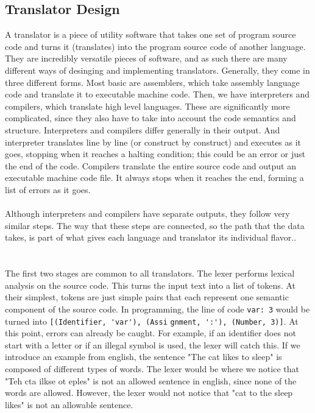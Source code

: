 \documentclass[a4paper, 12pt]{article}
\begin{document}
\subsection{Translator Design}\label{sec:translator-design}
A translator is a piece of utility software that takes one set of program source code and turns it (translates) into the program source code of another language. They are incredibly versatile pieces of software, and as such there are many different ways of desinging and implementing translators. Generally, they come in three different forms. Most basic are assemblers, which take assembly language code and translate it to executable machine code. Then, we have interpreters and compilers, which translate high level languages. These are significantly more complicated, since they also have to take into account the code semantics and structure. Interpreters and compilers differ generally in their output. And interpreter translates line by line (or construct by construct) and executes as it goes, stopping when it reaches a halting condition; this could be an error or just the end of the code. Compilers translate the entire source code and output an executable machine code file. It always stops when it reaches the end, forming a list of errors as it goes.\\
\\
Although interpreters and compilers have separate outputs, they follow very similar steps. The way that these steps are connected, so the path that the data takes, is part of what gives each language and translator its individual flavor..\\
\\
\\
The first two stages are common to all translators. The lexer performs lexical analysis on the source code. This turns the input text into a list of tokens. At their simplest, tokens are just simple pairs that each represent one semantic component of the source code. In programming, the line of code \verb|var: 3| would be turned into \verb|[(Identifier, 'var'), (Assi| \verb|gnment, ':'), (Number, 3)]|. At this point, errors can already be caught. For example, if an identifier does not start with a letter or if an illegal symbol is used, the lexer will catch this. If we introduce an example from english, the sentence "The cat likes to sleep" is composed of different types of words. The lexer would be where we notice that "Teh cta ilkse ot eples" is not an allowed sentence in english, since none of the words are allowed. However, the lexer would not notice that "cat to the sleep likes" is not an allowable sentence.\\
\end{document}
